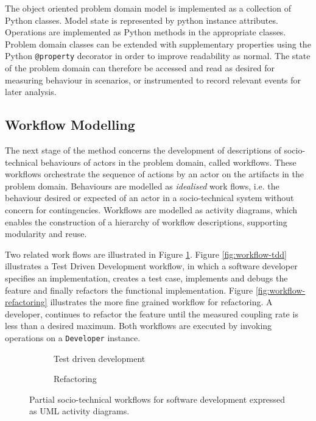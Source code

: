 \documentclass{sig-alternate}
\begin{document}
The object oriented problem domain model is implemented as a collection of
Python classes.  Model state is represented by python instance attributes.
Operations are implemented as Python methods in the appropriate classes.
Problem domain classes can be extended with supplementary properties using the
Python \lstinline!@property! decorator in order to improve readability as
normal.  The state of the problem domain can therefore be accessed and read as
desired for measuring behaviour in scenarios, or instrumented to record relevant
events for later analysis.


\subsection{Workflow Modelling}


The next stage of the method concerns the development of descriptions of
socio-technical behaviours of actors in the problem domain, called workflows.
These workflows orchestrate the sequence of actions by an actor on the artifacts
in the problem domain.  Behaviours are modelled as \emph{idealised} work flows,
i.e. the behaviour desired or expected of an actor in a socio-technical system
without concern for contingencies.  Workflows are modelled as activity diagrams,
which enables the construction of a hierarchy of workflow descriptions,
supporting modularity and reuse.

Two related work flows are illustrated in Figure \ref{fig:workflow-partial}.
Figure \ref{fig:workflow-tdd} illustrates a Test Driven Development workflow, in
which a software developer specifies an implementation, creates a test case,
implements and debugs the feature and finally refactors the functional
implementation.  Figure \ref{fig:workflow-refactoring} illustrates the more fine
grained workflow for refactoring.  A developer, continues to refactor the
feature until the measured coupling rate is less than a desired maximum.  Both
workflows are executed by invoking operations on a \lstinline!Developer!
instance.

\begin{figure}
  \centering

  \begin{subfigure}{\linewidth}


    \caption{Test driven development}
  \end{subfigure}

  \begin{subfigure}{\linewidth}
    
    \caption{Refactoring}
  \end{subfigure}
  
  \caption{Partial socio-technical workflows for software development expressed
    as UML activity diagrams.}

  \label{fig:workflow-partial}
\end{figure}
\end{document}
